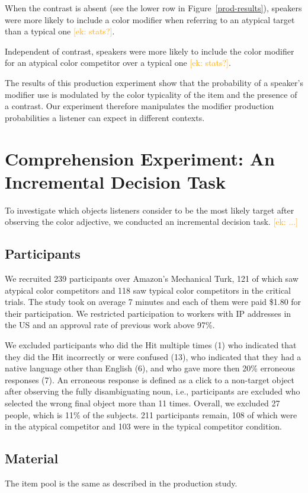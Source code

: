 \documentclass[10pt,letterpaper]{article}
\newcommand{\ek}[1]{\textcolor{Orange}{[ek: #1]}}
\begin{document}
When the contrast is absent (see the lower row in Figure~\ref{prod-results}), speakers were more likely to include a color modifier when referring to an atypical target than a typical one \ek{stats?}.

Independent of contrast, speakers were more likely to include the color modifier for an atypical color competitor over a typical one \ek{stats?}.

The results of this production experiment show that the probability of a speaker's modifier use is modulated by the color typicality of the item and the presence of a contrast. Our experiment therefore manipulates the modifier production probabilities a listener can expect in different contexts.


\section{Comprehension Experiment: An Incremental Decision Task}
To investigate which objects listeners consider to be the most likely target after observing the color adjective, we conducted an incremental decision task. \ek{...}


\subsection{Participants}
We recruited 239 participants over Amazon's Mechanical Turk, 121 of which saw atypical color competitors and 118 saw typical color competitors in the critical trials. The study took on average 7 minutes and each of them were paid \$1.80 for their participation. We restricted participation to workers with IP addresses in the US and an approval rate of previous work above 97\%.

We excluded participants who did the Hit multiple times (1) who indicated that they did the Hit incorrectly or were confused (13), who indicated that they had a native language other than English (6), and who gave more then 20\% erroneous responses (7). An erroneous response is defined as a click to a non-target object after observing the fully disambiguating noun, i.e., participants are excluded who selected the wrong final object more than 11 times. Overall, we excluded 27 people, which is 11\% of the subjects. 211 participants remain, 108 of which were in the atypical competitor and 103 were in the typical competitor condition. 


\subsection{Material}
The item pool is the same as described in the production study.
\end{document}
